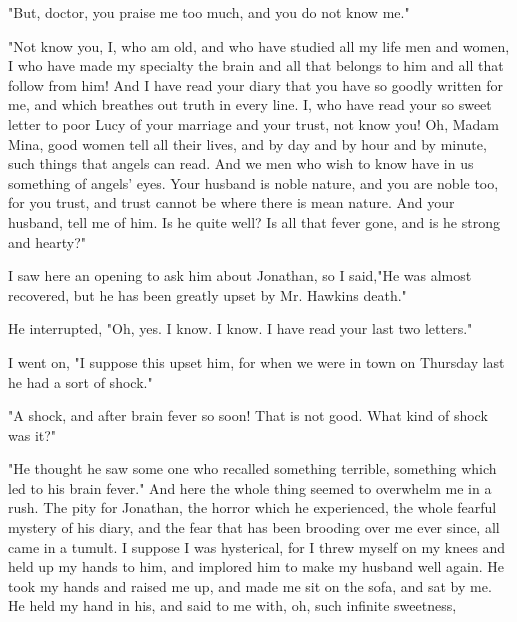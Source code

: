 "But, doctor, you praise me too much, and you do not know me." 

"Not know you, I, who am old, and who have studied all my life men and women, I who have made my specialty the brain and all that belongs to him and all that follow from him! And I have read your diary that you have so goodly written for me, and which breathes out truth in every line. I, who have read your so sweet letter to poor Lucy of your marriage and your trust, not know you! Oh, Madam Mina, good women tell all their lives, and by day and by hour and by minute, such things that angels can read. And we men who wish to know have in us something of angels' eyes. Your husband is noble nature, and you are noble too, for you trust, and trust cannot be where there is mean nature. And your husband, tell me of him. Is he quite well? Is all that fever gone, and is he strong and hearty?" 

I saw here an opening to ask him about Jonathan, so I said,"He was almost recovered, but he has been greatly upset by Mr. Hawkins death." 

He interrupted, "Oh, yes. I know. I know. I have read your last two letters." 

I went on, "I suppose this upset him, for when we were in town on Thursday last he had a sort of shock." 

"A shock, and after brain fever so soon! That is not good. What kind of shock was it?" 

"He thought he saw some one who recalled something terrible, something which led to his brain fever." And here the whole thing seemed to overwhelm me in a rush. The pity for Jonathan, the horror which he experienced, the whole fearful mystery of his diary, and the fear that has been brooding over me ever since, all came in a tumult. I suppose I was hysterical, for I threw myself on my knees and held up my hands to him, and implored him to make my husband well again. He took my hands and raised me up, and made me sit on the sofa, and sat by me. He held my hand in his, and said to me with, oh, such infinite sweetness, 

